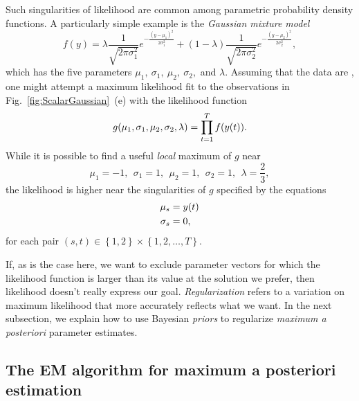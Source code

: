 Such singularities of likelihood are common among parametric
probability density functions.  A particularly simple example is the
\emph{Gaussian mixture model}
\begin{equation}
  \label{eq:GaussianMixture}
  f(y) = \lambda \frac{1}{\sqrt{2 \pi \sigma_1^2}}
  e^{-\frac{(y-\mu_1)^2}{2 \sigma_1^2}} + (1-\lambda) \frac{1}{\sqrt{2 \pi \sigma_2^2}}
  e^{-\frac{(y-\mu_2)^2}{2 \sigma_2^2}},
\end{equation}
which has the five parameters $\mu_1,~\sigma_1,~\mu_2,~\sigma_2,$ and $\lambda$.
Assuming that the data are \iid, one might attempt a maximum
likelihood fit to the observations in
Fig.~\ref{fig:ScalarGaussian}~(e) with the likelihood function
\begin{equation}
  \label{eq:GMLike}
  g(\mu_1,\sigma_1,\mu_2,\sigma_2,\lambda) = \prod_{t=1}^T f({y}{(t)}).
\end{equation}
While it is possible to find a useful \emph{local} maximum of $g$
near
\begin{equation*}
  \mu_1 = -1,~~\sigma_1 = 1,~~ \mu_2 = 1,~~ \sigma_2 = 1,~~ \lambda =
  \frac{2}{3},
\end{equation*}
the likelihood is higher near the singularities of $g$ specified by
the equations
\begin{align*}
  \mu_s &= {y}{(t)}\\
  \sigma_s &= 0,
\end{align*}
for each pair $(s,t)\in \left\{1,2\right\} \times \left\{ 1,2,\ldots,T
\right\}$.

If, as is the case here, we want to exclude parameter vectors for
which the likelihood function is larger than its value at the solution
we prefer, then likelihood doesn't really express our goal.
\emph{Regularization} refers to a variation on maximum likelihood
that more accurately reflects what we want.  In the next subsection,
we explain how to use Bayesian \emph{priors} to regularize
\emph{maximum a posteriori} parameter estimates.

\subsection{The EM algorithm for maximum a posteriori estimation}
\label{sec:EMMAP}

